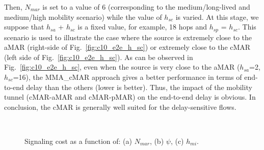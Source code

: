 Then, $N_{mar}$ is set to a value of 6 (corresponding to the medium/long-lived and medium/high mobility scenario) while the value of $h_{sc}$ is varied. At this stage, we suppose that $h_{sa}$ + $h_{sc}$ is a fixed value, for example, 18 hops and $h_{sp}$ = $h_{sc}$. This scenario is used to illustrate the case where the source is extremely close to the aMAR (right-side of Fig.~\ref{fig:c10_e2e_h_sc}) or extremely close to the cMAR (left side of Fig.~\ref{fig:c10_e2e_h_sc}). As can be observed in Fig.~\ref{fig:c10_e2e_h_sc}, even when the source is very close to the aMAR ($h_{sa}$=2, $h_{sc}$=16), the MMA\_cMAR approach gives a better performance in terms of end-to-end delay than the others (lower is better). Thus, the impact of the mobility tunnel (cMAR-aMAR and cMAR-pMAR) on the end-to-end delay is obvious. In conclusion, the cMAR is generally well suited for the delay-sensitive flows. 
\begin{figure}[h!]
\centering
{}
\,
\caption[Signaling cost.]{Signaling cost as a function of: (a) $N_{mar}$, (b) $\psi$, (c) $h_{mi}$.}
\label{fig:c10_sc}
\end{figure}
